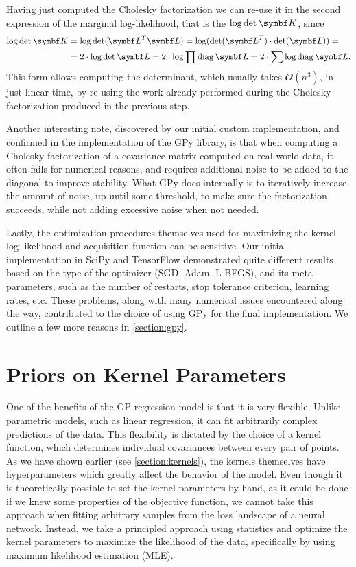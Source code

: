 Having just computed the Cholesky factorization we can re-use it in the second expression of the marginal log-likelihood, that is the $\log \det \mK$, since
\begin{align}
\log \det \mK &= \log \det(\mL^T \mL) = \log(\det(\mL^T) \cdot \det(\mL)) = \\
&= 2 \cdot \log \det \mL = 2 \cdot \log \prod \diag \mL = 2 \cdot \sum \log \diag \mL.
\end{align}
This form allows computing the determinant, which usually takes $𝓞(n^3)$, in just linear time, by re-using the work already performed during the Cholesky factorization produced in the previous step.

Another interesting note, discovered by our initial custom implementation, and confirmed in the implementation of the GPy \citep{gpy2014} library, is that when computing a Cholesky factorization of a covariance matrix computed on real world data, it often fails for numerical reasons, and requires additional noise to be added to the diagonal to improve stability. What GPy does internally is to iteratively increase the amount of noise, up until some threshold, to make sure the factorization succeeds, while not adding excessive noise when not needed.

Lastly, the optimization procedures themselves used for maximizing the kernel log-likelihood and acquisition function can be sensitive. Our initial implementation in SciPy and TensorFlow demonstrated quite different results based on the type of the optimizer (SGD, Adam, L-BFGS), and its meta-parameters, such as the number of restarts, stop tolerance criterion, learning rates, etc. These problems, along with many numerical issues encountered along the way, contributed to the choice of using GPy for the final implementation. We outline a few more reasons in \autoref{section:gpy}.


\section{Priors on Kernel Parameters}
\label{section:priors-on-kernel-params}

One of the benefits of the GP regression model is that it is very flexible. Unlike parametric models, such as linear regression, it can fit arbitrarily complex predictions of the data. This flexibility is dictated by the choice of a kernel function, which determines individual covariances between every pair of points. As we have shown earlier (see \autoref{section:kernels}), the kernels themselves have hyperparameters which greatly affect the behavior of the model. Even though it is theoretically possible to set the kernel parameters by hand, as it could be done if we knew some properties of the objective function, we cannot take this approach when fitting arbitrary samples from the loss landscape of a neural network. Instead, we take a principled approach using statistics and optimize the kernel parameters to maximize the likelihood of the data, specifically by using maximum likelihood estimation (MLE).

